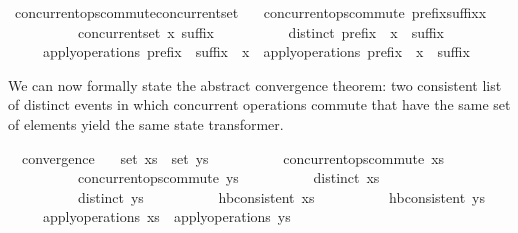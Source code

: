 \documentclass[acmlarge,review,anonymous]{acmart}\settopmatter{printfolios=true}
\begin{document}
\begin{isabellebody}
\isamarkupfalse%
\ concurrent{\isacharunderscore}ops{\isacharunderscore}commute{\isacharunderscore}concurrent{\isacharunderscore}set{\isacharcolon}\isanewline
\ \ \ {\isachardoublequoteopen}concurrent{\isacharunderscore}ops{\isacharunderscore}commute\ {\isacharparenleft}prefix{\isacharat}suffix{\isacharat}{\isacharbrackleft}x{\isacharbrackright}{\isacharparenright}{\isachardoublequoteclose}\isanewline
\ \ \ \ \ \ \ \ \ \ {\isachardoublequoteopen}concurrent{\isacharunderscore}set\ x\ suffix{\isachardoublequoteclose}\isanewline
\ \ \ \ \ \ \ \ \ \ {\isachardoublequoteopen}distinct\ {\isacharparenleft}prefix\ {\isacharat}\ x\ {\isacharhash}\ suffix{\isacharparenright}{\isachardoublequoteclose}\isanewline
\ \ \ \ \ {\isachardoublequoteopen}apply{\isacharunderscore}operations\ {\isacharparenleft}prefix\ {\isacharat}\ suffix\ {\isacharat}\ {\isacharbrackleft}x{\isacharbrackright}{\isacharparenright}\ {\isacharequal}\ apply{\isacharunderscore}operations\ {\isacharparenleft}prefix\ {\isacharat}\ x\ {\isacharhash}\ suffix{\isacharparenright}{\isachardoublequoteclose}\isanewline
\end{isabellebody}

We can now formally state the abstract convergence theorem: two consistent list
of distinct events in which concurrent operations commute that have the same
set of elements yield the same state transformer.

\begin{isabellebody}
  \isanewline
{}\isamarkupfalse%
\ \ convergence{\isacharcolon}\isanewline
\ \ \ {\isachardoublequoteopen}set\ xs\ {\isacharequal}\ set\ ys{\isachardoublequoteclose}\isanewline
\ \ \ \ \ \ \ \ \ \ {\isachardoublequoteopen}concurrent{\isacharunderscore}ops{\isacharunderscore}commute\ xs{\isachardoublequoteclose}\isanewline
\ \ \ \ \ \ \ \ \ \ {\isachardoublequoteopen}concurrent{\isacharunderscore}ops{\isacharunderscore}commute\ ys{\isachardoublequoteclose}\isanewline
\ \ \ \ \ \ \ \ \ \ {\isachardoublequoteopen}distinct\ xs{\isachardoublequoteclose}\isanewline
\ \ \ \ \ \ \ \ \ \ {\isachardoublequoteopen}distinct\ ys{\isachardoublequoteclose}\isanewline
\ \ \ \ \ \ \ \ \ \ {\isachardoublequoteopen}hb{\isacharunderscore}consistent\ xs{\isachardoublequoteclose}\isanewline
\ \ \ \ \ \ \ \ \ \ {\isachardoublequoteopen}hb{\isacharunderscore}consistent\ ys{\isachardoublequoteclose}\isanewline
\ \ \ \ \ {\isachardoublequoteopen}apply{\isacharunderscore}operations\ xs\ {\isacharequal}\ apply{\isacharunderscore}operations\ ys{\isachardoublequoteclose}\isanewline
\end{isabellebody}
\end{document}
